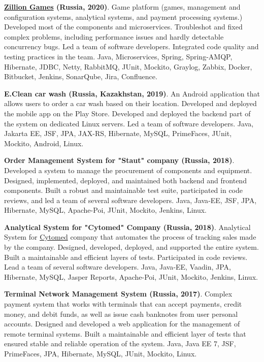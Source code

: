 \documentclass{vl}
\begin{document}
    \textbf{\href{http://zillion.games/}{Zillion Games} (Russia, 2020)}.
    Game platform (games, management and configuration systems, analytical systems, and payment processing systems.)
    Developed most of the components and microservices.
    Troubleshot and fixed complex problems, including performance issues and hardly detectable concurrency bugs.
    Led a team of software developers.
    Integrated code quality and testing practices in the team.
    Java, Microservices, Spring, Spring-AMQP, Hibernate, JDBC, Netty, RabbitMQ, JUnit, Mockito, Graylog, Zabbix, Docker,
    Bitbucket, Jenkins, SonarQube, Jira, Confluence.

    \textbf{E.Clean car wash (Russia, Kazakhstan, 2019)}.
    An Android application that allows users to order a car wash based on their location.
    Developed and deployed the mobile app on the Play Store.
    Developed and deployed the backend part of the system on dedicated Linux servers.
    Led a team of software developers.
    Java, Jakarta EE, JSF, JPA, JAX-RS, Hibernate, MySQL, PrimeFaces, JUnit, Mockito, Android, Linux.

    \textbf{Order Management System for "Staut" company (Russia, 2018)}.
    Developed a system to manage the procurement of components and equipment.
    Designed, implemented, deployed, and maintained both backend and frontend components.
    Built a robust and maintainable test suite, participated in code reviews, and led a team of several software developers.
    Java, Java‐EE, JSF, JPA, Hibernate, MySQL, Apache-Poi, JUnit, Mockito, Jenkins, Linux.

    \textbf{Analytical System for "Cytomed" Company (Russia, 2018)}.
    Analytical System for \href{https://cytomed.ru/en/}{Cytomed} company that automates the process of tracking sales
    made by the company.
    Designed, developed, deployed, and supported the entire system.
    Built a maintainable and efficient layers of tests.
    Participated in code reviews.
    Lead a team of several software developers.
    Java, Java‐EE, Vaadin, JPA, Hibernate, MySQL, Jasper Reports, Apache-Poi, JUnit, Mockito, Jenkins, Linux.

    \textbf{Terminal Network Management System (Russia, 2017)}.
    Complex payment system that works with terminals that can accept payments, credit money, and debit funds,
    as well as issue cash banknotes from user personal accounts.
    Designed and developed a web application for the management of remote terminal systems.
    Built a maintainable and efficient layer of tests that ensured stable and reliable operation of the system.
    Java, Java EE 7, JSF, PrimeFaces, JPA, Hibernate, MySQL, JUnit, Mockito, Linux.
\end{document}
